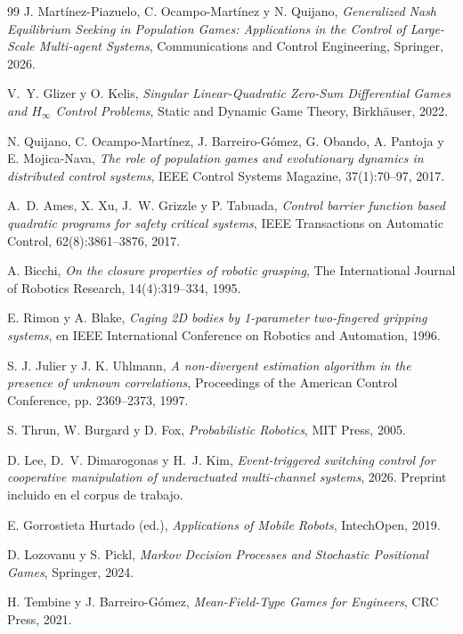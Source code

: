 \documentclass[11pt,a4paper]{article}
\theoremstyle{plain}
\theoremstyle{definition}
\theoremstyle{remark}
\begin{document}
\begin{thebibliography}{99}
J. Martínez-Piazuelo, C. Ocampo-Martínez y N. Quijano,
\emph{Generalized Nash Equilibrium Seeking in Population Games: Applications
in the Control of Large-Scale Multi-agent Systems},
Communications and Control Engineering, Springer, 2026.

V.~Y. Glizer y O. Kelis,
\emph{Singular Linear-Quadratic Zero-Sum Differential Games and $H_{\infty}$
Control Problems},
Static and Dynamic Game Theory, Birkhäuser, 2022.

N. Quijano, C. Ocampo-Martínez, J. Barreiro-Gómez, G. Obando, A. Pantoja y
E. Mojica-Nava,
\emph{The role of population games and evolutionary dynamics in distributed
control systems},
IEEE Control Systems Magazine, 37(1):70--97, 2017.

A.~D. Ames, X. Xu, J.~W. Grizzle y P. Tabuada,
\emph{Control barrier function based quadratic programs for safety critical
systems},
IEEE Transactions on Automatic Control, 62(8):3861--3876, 2017.

A. Bicchi,
\emph{On the closure properties of robotic grasping},
The International Journal of Robotics Research, 14(4):319--334, 1995.

E. Rimon y A. Blake,
\emph{Caging 2D bodies by 1-parameter two-fingered gripping systems},
en IEEE International Conference on Robotics and Automation, 1996.

S. J. Julier y J. K. Uhlmann,
\emph{A non-divergent estimation algorithm in the presence of unknown
correlations},
Proceedings of the American Control Conference, pp. 2369--2373, 1997.

S. Thrun, W. Burgard y D. Fox,
\emph{Probabilistic Robotics},
MIT Press, 2005.

D. Lee, D.~V. Dimarogonas y H.~J. Kim,
\emph{Event-triggered switching control for cooperative manipulation of
underactuated multi-channel systems},
2026. Preprint incluido en el corpus de trabajo.

E. Gorrostieta Hurtado (ed.),
\emph{Applications of Mobile Robots},
IntechOpen, 2019.

D. Lozovanu y S. Pickl,
\emph{Markov Decision Processes and Stochastic Positional Games},
Springer, 2024.

H. Tembine y J. Barreiro-Gómez,
\emph{Mean-Field-Type Games for Engineers},
CRC Press, 2021.


\end{thebibliography}
\end{document}
